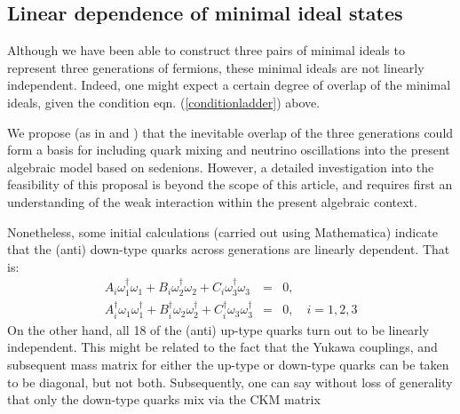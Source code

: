 \documentclass{article}
\begin{document}
\subsection{Linear dependence of minimal ideal states}
Although we have been able to construct three pairs of minimal ideals to represent three generations of fermions, these minimal ideals are not linearly independent. Indeed,  one might expect a certain degree of overlap of the minimal ideals, given the condition eqn. (\ref{conditionladder}) above.

We propose (as in \cite{gillard2019three} and  \cite{manogue2022octions}) that the inevitable overlap of the three generations could form a basis for including quark mixing and neutrino oscillations into the present algebraic model based on sedenions. However, a detailed investigation into the feasibility of this proposal is beyond the scope of this article, and requires first an understanding of the weak interaction within the present algebraic context.

Nonetheless, some initial calculations (carried out using Mathematica) indicate that the (anti) down-type quarks across generations are linearly dependent. That is:
\begin{eqnarray}
    A_i\omega_1^{\dagger}\omega_1+B_i\omega_2^{\dagger}\omega_2+C_i\omega_3^{\dagger}\omega_3&=&0,\\
    A_i^{\dagger}\omega_1\omega_1^{\dagger}+B_i^{\dagger}\omega_2\omega_2^{\dagger}+C_i^{\dagger}\omega_3\omega_3^{\dagger}&=&0,\quad i=1,2,3
\end{eqnarray}
On the other hand, all 18 of the (anti) up-type quarks turn out to be linearly independent. This might be related to the fact that the Yukawa couplings, and subsequent mass matrix for either the up-type or down-type quarks can be taken to be diagonal, but not both. Subsequently, one can say without loss of generality that only the down-type quarks mix via the CKM matrix


\end{document}

